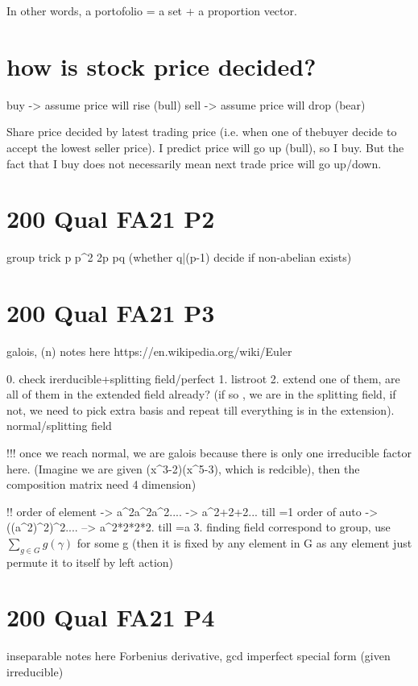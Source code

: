 {{{{{{{In other words, a portofolio = a set + a proportion vector.

\section*{how is stock price decided?}

buy -> assume price will rise (bull)
sell -> assume price will drop (bear)

Share price decided by latest trading price (i.e. when one of thebuyer decide to accept the lowest seller price). 
	I predict price will go up (bull), so I buy. But the fact that I buy does not necessarily mean next trade price will go up/down.





\section*{200 Qual FA21 P2}

group trick
	p
	p^2
	2p
	pq (whether q|(p-1) decide if non-abelian exists)
		
\section*{200 Qual FA21 P3}
galois, \phi(n) notes here
	https://en.wikipedia.org/wiki/Euler%
	
	0. check irerducible+splitting field/perfect
	1. listroot
	2. extend one of them, are all of them in the extended field already? (if so , we are in the splitting field, if not, we need to pick extra basis and repeat till everything is in the extension).
normal/splitting field

!!! once we reach normal, we are galois because there is only one irreducible factor here. (Imagine we are given (x^3-2)(x^5-3), which is redcible), then the composition matrix need 4 dimension)

!! order of element -> a^2a^2a^2.... -> a^{2+2+2...} till =1
	order of auto -> ((a^2)^2)^2.... --> a^{2*2*2*2.} till =a
	3. finding field correspond to group, use $\sum_{g \in G} g(\gamma)$ for some g (then it is fixed by any element in G as any element just permute it to itself by left action)
	

\section*{200 Qual FA21 P4}
inseparable notes here
	Forbenius
	derivative, gcd
	imperfect
	special form (given irreducible)
	
}}}}}}}
